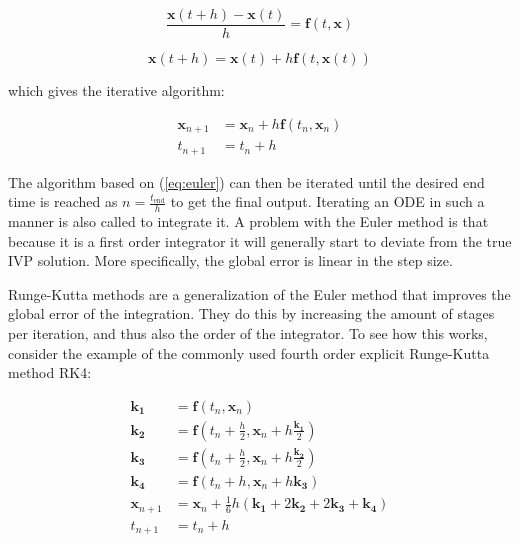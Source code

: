 \documentclass[12pt,a4paper]{book}
\begin{document}
\begin{equation*}
    \frac{\bm{x}(t + h) - \bm{x}(t)}{h} = \bm{f}(t, \bm{x})
\end{equation*}

\begin{equation*}
    \bm{x}(t + h) = \bm{x}(t) + h \bm{f}(t, \bm{x}(t))
\end{equation*}

\noindent which gives the iterative algorithm:

\begin{equation}
    \begin{split}
        \bm{x}_{n+1} &= \bm{x}_n + h \bm{f}(t_n, \bm{x}_n) \\
        t_{n+1} &= t_n + h
    \end{split}
    \label{eq:euler}
\end{equation}

The algorithm based on (\ref{eq:euler}) can then be iterated until the desired end time is reached as $n = \frac{t_{\textrm{end}}}{h}$ to get the final output. Iterating an ODE in such a manner is also called to integrate it. A problem with the Euler method is that because it is a first order integrator it will generally start to deviate from the true IVP solution. More specifically, the global error is linear in the step size.

Runge-Kutta methods are a generalization of the Euler method that improves the global error of the integration. They do this by increasing the amount of stages per iteration, and thus also the order of the integrator. To see how this works, consider the example of the commonly used fourth order explicit Runge-Kutta method RK4:

\begin{equation}
    \begin{split}
        \bm{k_1} &= \bm{f}(t_n, \bm{x}_n) \\
        \bm{k_2} &= \bm{f}(t_n + \frac{h}{2}, \bm{x}_n + h \frac{\bm{k_1}}{2}) \\
        \bm{k_3} &= \bm{f}(t_n + \frac{h}{2}, \bm{x}_n + h \frac{\bm{k_2}}{2}) \\
        \bm{k_4} &= \bm{f}(t_n + h, \bm{x}_n + h \bm{k_3}) \\
        \bm{x}_{n+1} &= \bm{x}_n + \frac{1}{6} h (\bm{k_1} + 2 \bm{k_2} + 2 \bm{k_3} + \bm{k_4}) \\
        t_{n+1} &= t_n + h
    \end{split}
    \label{eq:rk4}
\end{equation}
\end{document}
